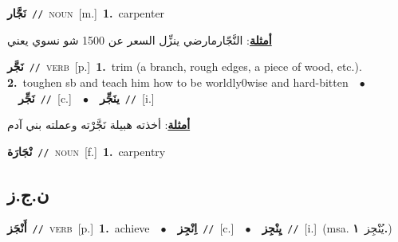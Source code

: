 \documentclass[10pt,a4paper,twoside]{article} %
\begin{document}
\begin{multicols}{2}
{\setlength\topsep{0pt}\textbf{\foreignlanguage{arabic}{نَجَّار}}\ {\color{gray}\texttt{//}\color{black}}\ \textsc{noun}\ [m.]\ \textbf{1.}~carpenter\  \begin{flushright}\color{gray}\foreignlanguage{arabic}{\textbf{\underline{\foreignlanguage{arabic}{أمثلة}}}: النَّجّارمارضي ينزِّل السعر عن 1500 شو نسوي يعني}\end{flushright}\color{black}} \vspace{2mm}

{\setlength\topsep{0pt}\textbf{\foreignlanguage{arabic}{نَجَّر}}\ {\color{gray}\texttt{//}\color{black}}\ \textsc{verb}\ [p.]\ \textbf{1.}~trim (a branch, rough edges, a piece of wood, etc.).  \textbf{2.}~toughen sb and teach him how to be worldly0wise and hard-bitten\ \ $\bullet$\ \ \setlength\topsep{0pt}\textbf{\foreignlanguage{arabic}{نَجِّر}}\ {\color{gray}\texttt{//}\color{black}}\ [c.]\ \ $\bullet$\ \ \setlength\topsep{0pt}\textbf{\foreignlanguage{arabic}{ينَجِّر}}\ {\color{gray}\texttt{//}\color{black}}\ [i.]\  \begin{flushright}\color{gray}\foreignlanguage{arabic}{\textbf{\underline{\foreignlanguage{arabic}{أمثلة}}}: أخذته هبيلة نَجَّرْته وعملته بني آدم}\end{flushright}\color{black}} \vspace{2mm}

{\setlength\topsep{0pt}\textbf{\foreignlanguage{arabic}{نْجَارَة}}\ {\color{gray}\texttt{//}\color{black}}\ \textsc{noun}\ [f.]\ \textbf{1.}~carpentry\ } \vspace{2mm}

\vspace{-3mm}
\subsection*{\color{blue}\foreignlanguage{arabic}{ن.ج.ز}\color{blue}{}} 

{\setlength\topsep{0pt}\textbf{\foreignlanguage{arabic}{أَنْجَز}}\ {\color{gray}\texttt{//}\color{black}}\ \textsc{verb}\ [p.]\ \textbf{1.}~achieve\ \ $\bullet$\ \ \setlength\topsep{0pt}\textbf{\foreignlanguage{arabic}{اِنْجِز}}\ {\color{gray}\texttt{//}\color{black}}\ [c.]\ \ $\bullet$\ \ \setlength\topsep{0pt}\textbf{\foreignlanguage{arabic}{يِنْجِز}}\ {\color{gray}\texttt{//}\color{black}}\ [i.]\ \color{gray}(msa. \foreignlanguage{arabic}{يُنْجِز}~\foreignlanguage{arabic}{\textbf{١.}})\color{black}\ } \vspace{2mm}


\end{multicols}
\end{document}
